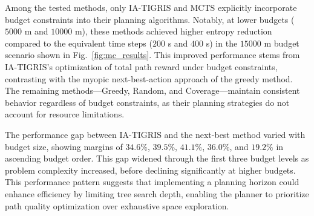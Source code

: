 Among the tested methods, only IA-TIGRIS and MCTS explicitly incorporate budget constraints into their planning algorithms. Notably, at lower budgets ($5000$ m and $10000$ m), these methods achieved higher entropy reduction compared to the equivalent time steps ($200$ s and $400$ s) in the $15000$ m budget scenario shown in Fig.~\ref{fig:mc_results}. This improved performance stems from IA-TIGRIS's optimization of total path reward under budget constraints, contrasting with the myopic next-best-action approach of the greedy method. The remaining methods---Greedy, Random, and Coverage---maintain consistent behavior regardless of budget constraints, as their planning strategies do not account for resource limitations.


The performance gap between IA-TIGRIS and the next-best method varied with budget size, showing margins of $34.6\%$, $39.5\%$, $41.1\%$, $36.0\%$, and $19.2\%$ in ascending budget order. This gap widened through the first three budget levels as problem complexity increased, before declining significantly at higher budgets. This performance pattern suggests that implementing a planning horizon could enhance efficiency by limiting tree search depth, enabling the planner to prioritize path quality optimization over exhaustive space exploration.




